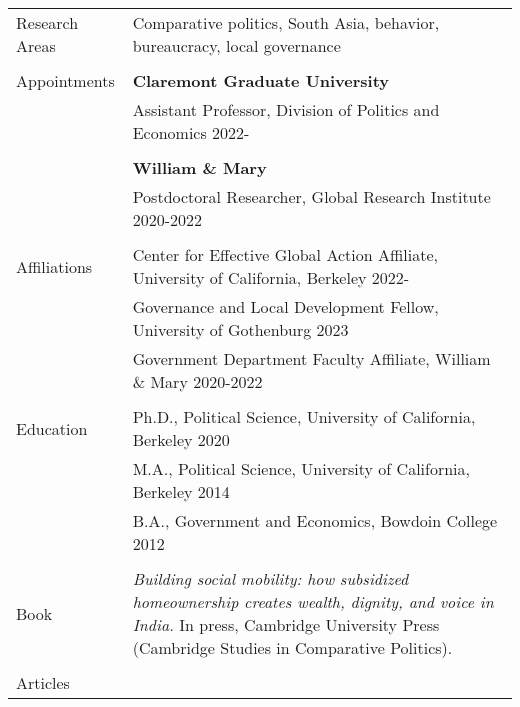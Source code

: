 \documentclass[letterpaper, 10.5pt]{article}
\begin{document}
\begin{longtable}{p{1.5in}p{5in}}

Research Areas & Comparative politics, South Asia,  behavior, bureaucracy, local governance \\
& \\
Appointments 
& \textbf{Claremont Graduate University} \hfill  \\
& Assistant Professor, Division of Politics and Economics \hfill  2022-\\

& \\

& \textbf{William \& Mary} \hfill \\
& Postdoctoral Researcher, Global Research Institute \hfill 2020-2022 \\


& \\

Affiliations & Center for Effective Global Action Affiliate, University of California,  Berkeley \hfill 2022-\\ 
& Governance and Local Development Fellow, University of Gothenburg \hfill 2023\\


& Government Department Faculty Affiliate, William \& Mary \hfill 2020-2022  \\
& \\
{Education} 
&Ph.D., Political Science, University of California, Berkeley \hfill 2020 \\


& M.A., Political Science, University of California, Berkeley \hfill 2014 \\
& B.A., Government and Economics, Bowdoin College  \hfill 2012 \\

& \\

Book &  \textit{Building social mobility: how subsidized homeownership creates wealth, dignity, and voice in India.} In press, Cambridge University Press (Cambridge Studies in Comparative Politics).\\

& \\

\nohyphens{{Articles}} 


\end{longtable}
\end{document}
